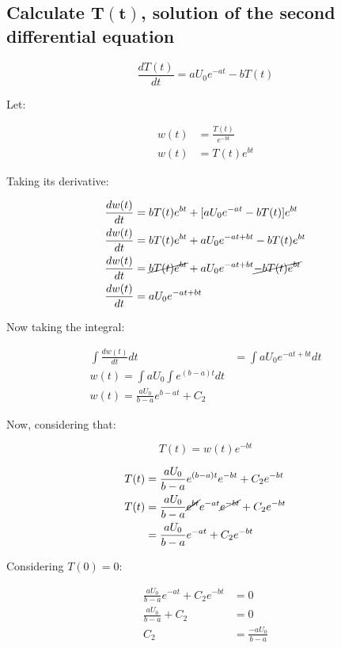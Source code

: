   \subsection{Calculate $\mathbf{T(t)}$, solution of the second differential equation}

  $$\frac{dT(t)}{dt} = aU_0e^{-at} - bT(t)$$

  Let:

  \begin{align*}
    w(t) &= \frac{T(t)}{e^{-bt}}\\
    w(t) &= T(t)e^{bt}
  \end{align*}

  Taking its derivative:

  \begin{align*}
    \frac{dw(t)}{dt} &= bT(t)e^{bt} + [aU_0e^{-at} - bT(t)]e^{bt}\\
    \frac{dw(t)}{dt} &= bT(t)e^{bt} + aU_0e^{-at + bt} - bT(t)e^{bt}\\
    \frac{dw(t)}{dt} &= \cancel{bT(t)e^{bt}} + aU_0e^{-at + bt} \cancel{- bT(t)e^{bt}}\\
    \frac{dw(t)}{dt} &= aU_0e^{-at + bt}
  \end{align*}

  Now taking the integral:

  \begin{align*}
    \int\frac{dw(t)}{dt}dt &= \int aU_0 e^{-at + bt}dt\\
    w(t) = \int aU_0\int e^{(b-a)t}dt\\
    w(t) = \frac{aU_0}{b-a}e^{b-at} + C_2
  \end{align*}

  Now, considering that:

  $$T(t) = w(t)e^{-bt}$$

  \begin{align*}
    T(t) & = \frac{aU_0}{b-a}e^{(b-a)t}e^{-bt} + C_2e^{-bt}\\
    T(t) & = \frac{aU_0}{b-a}\cancel{e^{bt}}e^{-at}\cancel{e^{-bt}} + C_2e^{-bt}\\
         & = \frac{aU_0}{b-a}e^{-at} + C_2e^{-bt}
  \end{align*}

  Considering $T(0) = 0$:

  \begin{align*}
    \frac{aU_0}{b-a}e^{-at} + C_2e^{-bt} & = 0\\
    \frac{aU_0}{b-a} + C_2 & = 0\\
    C_2 &= \frac{-aU_0}{b-a}\\
  \end{align*}


